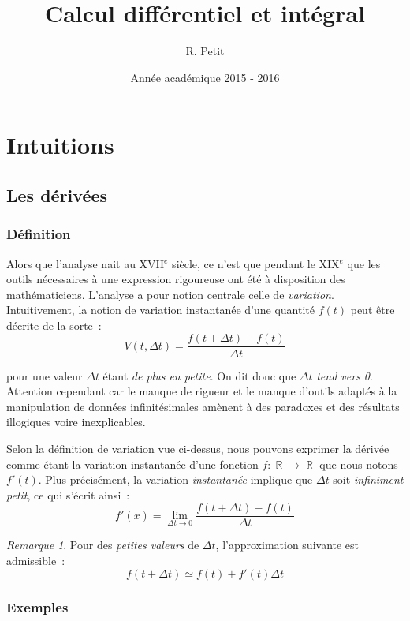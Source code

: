 \documentclass{article}
\title{Calcul différentiel et intégral}
\author{R. Petit}
\date{Année académique 2015 - 2016}
\DeclareMathOperator{\R}{\mathbb R}
\theoremstyle{definition}
\theoremstyle{remark}
\newtheorem*{rmq}{Remarque}
\begin{document}
\maketitle
\tableofcontents
\newpage
\setcounter{page}{1}

\newpage

\section{Intuitions}
	\subsection{Les dérivées}
		\subsubsection{Définition}
			Alors que l'analyse nait au XVII$^e$ siècle, ce n'est que pendant le XIX$^e$ que les outils nécessaires à une
			expression rigoureuse ont été à disposition des mathématiciens. L'analyse a pour notion centrale celle de \textit{variation}.
			Intuitivement, la notion de variation instantanée d'une quantité $f(t)$ peut être décrite de la sorte~:
			\[V(t, \Delta t) = \frac {f(t + \Delta t) - f(t)}{\Delta t}\]

			pour une valeur $\Delta t$ étant \textit{de plus en petite}. On dit donc que $\Delta t$ \textit{tend vers 0}. Attention
			cependant car le manque de rigueur et le manque d'outils adaptés à la manipulation de données infinitésimales amènent à des
			paradoxes et des résultats illogiques voire inexplicables.

			Selon la définition de variation vue ci-dessus, nous pouvons exprimer la dérivée comme étant la variation instantanée d'une
			fonction $f : \R \to \R$ que nous notons $f'(t)$. Plus précisément, la variation \textit{instantanée} implique
			que $\Delta t$ soit \textit{infiniment petit}, ce qui s'écrit ainsi~:
			\[f'(x) = \lim_{\Delta t \to 0}\frac {f(t + \Delta t) - f(t)}{\Delta t}\]

			\begin{rmq} Pour des \textit{petites valeurs} de $\Delta t$, l'approximation suivante est admissible~:
			\[f(t + \Delta t) \simeq f(t) + f'(t)\Delta t\]
			\end{rmq}

		\subsubsection{Exemples}
\end{document}
